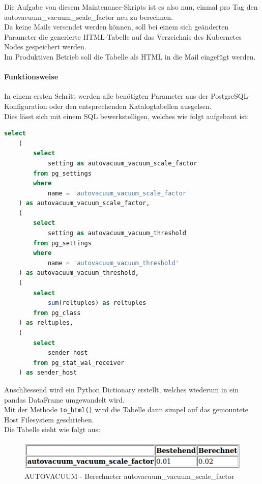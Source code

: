 \begin{flushleft}
    Die Aufgabe von diesem Maintenance-Skripts ist es also nun, einmal pro Tag den autovacuum\_vacuum\_scale\_factor neu zu berechnen.\\
    Da keine Mails versendet werden können, soll bei einem sich geänderten Parameter die generierte HTML-Tabelle auf das Verzeichnis des \Gls{Kubernetes} Nodes gespeichert werden.\\
    Im Produktiven Betrieb soll die Tabelle als HTML in die Mail eingefügt werden.
    \paragraph{Funktionsweise}
    In einem ersten Schritt werden alle benötigten Parameter aus der \Gls{PostgreSQL}-Konfiguration oder den entsprechenden Katalogtabellen ausgelsen.\\
    Dies lässt sich mit einem SQL bewerkstelligen, welches wie folgt aufgebaut ist:
    \lstset{style=gra_codestyle}
    \begin{lstlisting}[language=sql, caption=Maintenance-Tool - Parameter - Maintenance-Tool - AUTOVACUUM,captionpos=b,label={lst:maintenannce-tool-parameter-maintenance-tool-autovacuum},breaklines=true]
select
    (
        select
            setting as autovacuum_vacuum_scale_factor
        from pg_settings
        where
            name = 'autovacuum_vacuum_scale_factor'
    ) as autovacuum_vacuum_scale_factor,
    (
        select
            setting as autovacuum_vacuum_threshold
        from pg_settings
        where
            name = 'autovacuum_vacuum_threshold'
    ) as autovacuum_vacuum_threshold,
    (
        select
            sum(reltuples) as reltuples
        from pg_class
    ) as reltuples,
    (
        select
            sender_host
        from pg_stat_wal_receiver
    ) as sender_host
    \end{lstlisting}
\end{flushleft}
\begin{flushleft}
    Anschliessend wird ein Python Dictionary erstellt, welches wiederum in ein pandas DataFrame umgewandelt wird.\\
    Mit der Methode \texttt{to\_html()} wird die Tabelle dann simpel auf das gemountete Host Filesystem geschrieben.\\
    Die Tabelle sieht wie folgt aus:
    \begin{figure}[H]
        \centering
        \includegraphics[width=1\linewidth]{source/implementation/construction_implementation/maintenance_tool_autovacuum/autovacuum_result_html_table}
        \caption{\Gls{AUTOVACUUM} - Berechneter autovacuum\_vacuum\_scale\_factor}
        \label{fig:autovacuum_result_html_table}
    \end{figure}
\end{flushleft}